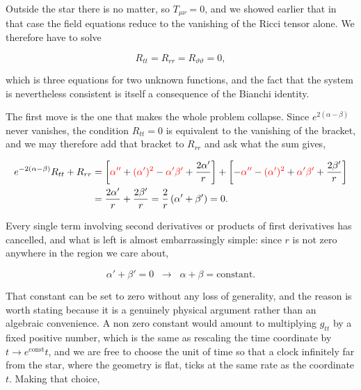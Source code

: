         Outside the star there is no matter, so $T_{\mu\nu}=0$, and we showed earlier that in that case the field equations reduce to the vanishing of the Ricci tensor alone. We therefore have to solve

        \begin{equation}\label{eq:VacuumSchw}
            R_{tt} = R_{rr} = R_{\vartheta\vartheta} = 0,
        \end{equation}

        which is three equations for two unknown functions, and the fact that the system is nevertheless consistent is itself a consequence of the Bianchi identity.

        The first move is the one that makes the whole problem collapse. Since $e^{2(\alpha-\beta)}$ never vanishes, the condition $R_{tt}=0$ is equivalent to the vanishing of the bracket, and we may therefore add that bracket to $R_{rr}$ and ask what the sum gives,

        \begin{align*}
            e^{-2(\alpha-\beta)}R_{tt} + R_{rr} &= \left[{\color{red}\alpha''} + {\color{red}(\alpha')^2} - {\color{red}\alpha'\beta'} + \frac{2\alpha'}{r}\right] + \left[-{\color{red}\alpha''} - {\color{red}(\alpha')^2} + {\color{red}\alpha'\beta'} + \frac{2\beta'}{r}\right]\\
            &= \frac{2\alpha'}{r} + \frac{2\beta'}{r} = \frac{2}{r}\left(\alpha'+\beta'\right) = 0.
        \end{align*}

        Every single term involving second derivatives or products of first derivatives has cancelled, and what is left is almost embarrassingly simple: since $r$ is not zero anywhere in the region we care about,

        \begin{equation}
            \alpha' + \beta' = 0 \;\;\longrightarrow\;\; \alpha + \beta = \text{constant}.
        \end{equation}

        That constant can be set to zero without any loss of generality, and the reason is worth stating because it is a genuinely physical argument rather than an algebraic convenience. A non zero constant would amount to multiplying $g_{tt}$ by a fixed positive number, which is the same as rescaling the time coordinate by $t\rightarrow e^{\text{const}}t$, and we are free to choose the unit of time so that a clock infinitely far from the star, where the geometry is flat, ticks at the same rate as the coordinate $t$. Making that choice,

